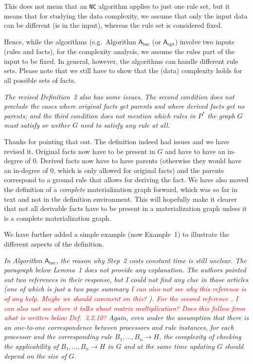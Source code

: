 \documentclass{article}
\let\quoteOld\quote
\let\endquoteOld\endquote
\renewenvironment{quote}{\quoteOld\itshape}{\endquoteOld}
\begin{document}
This does not mean that an \texttt{NC} algorithm applies to just one
rule set, but it means that for studying the data complexity, we
assume that only the input data can be different (is in the input),
whereas the rule set is considered fixed.

Hence, while the algorithms (e.g.\ Algorithm $\mathsf{A}_\text{bsc}$
(or $\mathsf{A}_\text{opt}$) involve two inputs (rules and facts),
for the complexity analysis, we assume the rules part of the input to
be fixed. In general, however, the algorithms can handle different
rule sets. Please note that we still have to show that the (data)
complexity holds for all possible sets of facts.

\begin{quote}
  The revised Definition~2 also has some issues. The second condition
  does not preclude the cases where original facts get parents and
  where derived facts get no parents; and the third condition does not
  mention which rules in $P^*$ the graph $G$ must satisfy or wether
  $G$ need to satisfy any rule at all.
\end{quote}

Thanks for pointing that out. The definition indeed had issues and we
have revised it. Original facts now have to be present in $G$ and have
to have an in-degree of $0$. Derived facts now have to have parents
(otherwise they would have an in-degree of $0$, which is only allowed
for original facts) and the parents correspond to a ground rule that
allows for deriving the fact. We have also moved the definition of a
\emph{complete} materialization graph forward, which was so far in
text and not in the definition environment. This will hopefully make
it clearer that not all derivable facts have to be present in a
materialization graph unless it is a complete materialization graph.

We have further added a simple example (now Example~1) to illustrate
the different aspects of the definition. 

\begin{quote}
  In Algorithm $\mathsf{A}_\text{bst}$, the reason why Step~2 costs
  constant time is still unclear. The paragraph below Lemma~1 does not
  provide any explanation. The authors pointed out two references in
  their response, but I could not find any clue in those articles (one
  of which is just a two page summary \textcolor{red}{I can also not
    see why this reference is of any help. Maybe we should comment on
    this? }). \textcolor{red}{For the second reference
    \cite{Raymond95}, I can also not see where it talks about matrix
    multiplication? Does this follow from what is written below
    Def.~3.2.10?} Again, even under the assumption that there is an
  one-to-one correspondence between processors and rule instances, for
  each processor and the corresponding rule $B_1, \ldots, B_n \to H$,
  the complexity of checking the applicability of
  $B_1, \ldots, B_n \to H$ in $G$ and at the same time updating $G$
  should depend on the size of $G$.
\end{quote}
\end{document}
